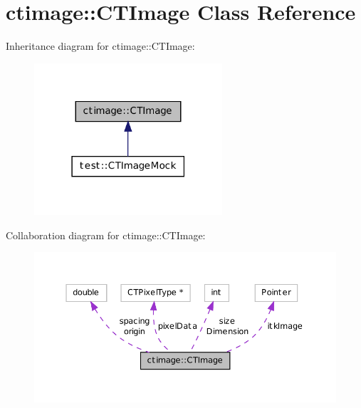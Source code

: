 \hypertarget{classctimage_1_1_c_t_image}{
\section{ctimage::CTImage Class Reference}
\label{classctimage_1_1_c_t_image}
}


Inheritance diagram for ctimage::CTImage:\nopagebreak
\begin{figure}[H]
\begin{center}
\leavevmode
\includegraphics[width=198pt]{classctimage_1_1_c_t_image__inherit__graph}
\end{center}
\end{figure}


Collaboration diagram for ctimage::CTImage:\nopagebreak
\begin{figure}[H]
\begin{center}
\leavevmode
\includegraphics[width=375pt]{classctimage_1_1_c_t_image__coll__graph}
\end{center}
\end{figure}

